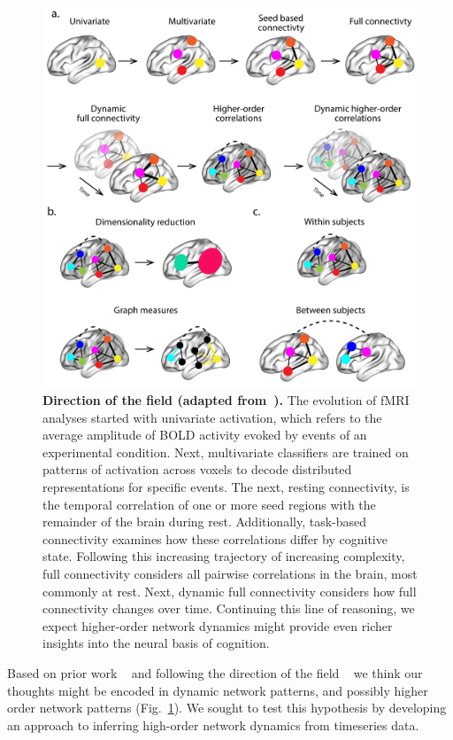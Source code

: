 \documentclass[english]{article}
\begin{document}
\begin{figure}
  \centering
  \includegraphics[width=\textwidth]{figs/direction_of_field}
  \caption{\textbf{Direction of the field (adapted from~\citep{Turk13}).} The evolution of fMRI analyses started with
    univariate activation, which refers to
    the average amplitude of BOLD activity evoked by events of an
    experimental condition. Next, multivariate classifiers are trained
    on patterns of activation across voxels to decode distributed
    representations for specific events. The next, resting
    connectivity, is the temporal correlation of one or more seed
    regions with the remainder of the brain during rest. Additionally,
    task-based connectivity examines how these correlations differ by
    cognitive state. Following this increasing trajectory of
    increasing complexity, full connectivity considers all pairwise
    correlations in the brain, most commonly at rest.  Next, dynamic
    full connectivity considers how full connectivity changes over
    time. Continuing this line of reasoning, we expect higher-order network dynamics might provide even richer insights into the neural basis of cognition.}
  \label{fig:direction_of_field}
\end{figure}



Based on prior work ~\citep{DemeEtal19} and following the direction of the field ~\citep{Turk13} we think our thoughts might be encoded in
dynamic network patterns, and possibly higher order network
patterns (Fig.~\ref{fig:direction_of_field}). We sought to test this hypothesis by developing an approach
to inferring high-order network dynamics from timeseries data. 
\end{document}
